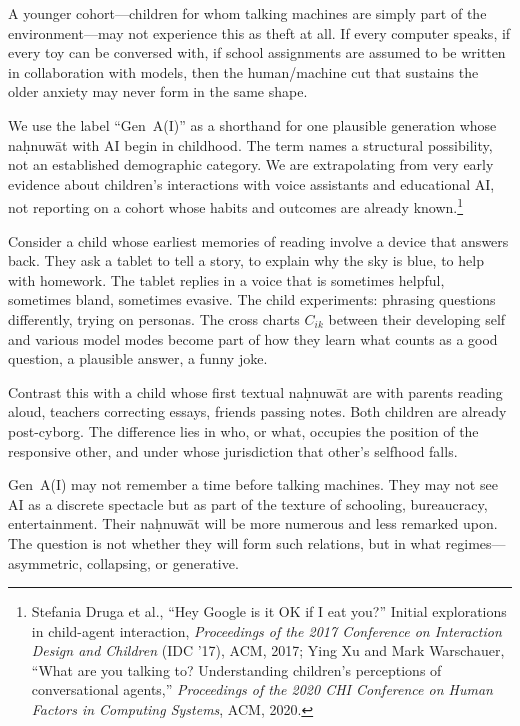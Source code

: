 A younger cohort---children for whom talking machines are simply part of the environment---may not experience this as theft at all. If every computer speaks, if every toy can be conversed with, if school assignments are assumed to be written in collaboration with models, then the human/machine cut that sustains the older anxiety may never form in the same shape.

We use the label ``Gen~A(I)'' as a shorthand for one plausible generation whose na\d{h}nuw\={a}t with AI begin in childhood. The term names a structural possibility, not an established demographic category. We are extrapolating from very early evidence about children's interactions with voice assistants and educational AI, not reporting on a cohort whose habits and outcomes are already known.\footnote{Stefania Druga et al., ``Hey Google is it OK if I eat you?'' Initial explorations in child-agent interaction, \emph{Proceedings of the 2017 Conference on Interaction Design and Children} (IDC '17), ACM, 2017; Ying Xu and Mark Warschauer, ``What are you talking to? Understanding children's perceptions of conversational agents,'' \emph{Proceedings of the 2020 CHI Conference on Human Factors in Computing Systems}, ACM, 2020.}

Consider a child whose earliest memories of reading involve a device that answers back. They ask a tablet to tell a story, to explain why the sky is blue, to help with homework. The tablet replies in a voice that is sometimes helpful, sometimes bland, sometimes evasive. The child experiments: phrasing questions differently, trying on personas. The cross charts $C_{ik}$ between their developing self and various model modes become part of how they learn what counts as a good question, a plausible answer, a funny joke.

Contrast this with a child whose first textual na\d{h}nuw\={a}t are with parents reading aloud, teachers correcting essays, friends passing notes. Both children are already post-cyborg. The difference lies in who, or what, occupies the position of the responsive other, and under whose jurisdiction that other's selfhood falls.

Gen~A(I) may not remember a time before talking machines. They may not see AI as a discrete spectacle but as part of the texture of schooling, bureaucracy, entertainment. Their na\d{h}nuw\={a}t will be more numerous and less remarked upon. The question is not whether they will form such relations, but in what regimes---asymmetric, collapsing, or generative.

